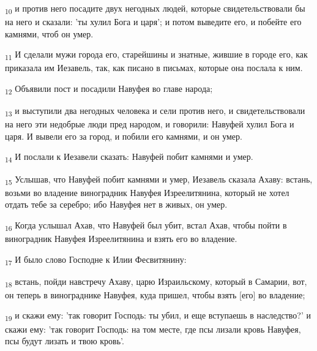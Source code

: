 \begin{tcolorbox}
\textsubscript{10} и против него посадите двух негодных людей, которые свидетельствовали бы на него и сказали: 'ты хулил Бога и царя'; и потом выведите его, и побейте его камнями, чтоб он умер.
\end{tcolorbox}
\begin{tcolorbox}
\textsubscript{11} И сделали мужи города его, старейшины и знатные, жившие в городе его, как приказала им Иезавель, так, как писано в письмах, которые она послала к ним.
\end{tcolorbox}
\begin{tcolorbox}
\textsubscript{12} Объявили пост и посадили Навуфея во главе народа;
\end{tcolorbox}
\begin{tcolorbox}
\textsubscript{13} и выступили два негодных человека и сели против него, и свидетельствовали на него эти недобрые люди пред народом, и говорили: Навуфей хулил Бога и царя. И вывели его за город, и побили его камнями, и он умер.
\end{tcolorbox}
\begin{tcolorbox}
\textsubscript{14} И послали к Иезавели сказать: Навуфей побит камнями и умер.
\end{tcolorbox}
\begin{tcolorbox}
\textsubscript{15} Услышав, что Навуфей побит камнями и умер, Иезавель сказала Ахаву: встань, возьми во владение виноградник Навуфея Изреелитянина, который не хотел отдать тебе за серебро; ибо Навуфея нет в живых, он умер.
\end{tcolorbox}
\begin{tcolorbox}
\textsubscript{16} Когда услышал Ахав, что Навуфей был убит, встал Ахав, чтобы пойти в виноградник Навуфея Изреелитянина и взять его во владение.
\end{tcolorbox}
\begin{tcolorbox}
\textsubscript{17} И было слово Господне к Илии Фесвитянину:
\end{tcolorbox}
\begin{tcolorbox}
\textsubscript{18} встань, пойди навстречу Ахаву, царю Израильскому, который в Самарии, вот, он теперь в винограднике Навуфея, куда пришел, чтобы взять [его] во владение;
\end{tcolorbox}
\begin{tcolorbox}
\textsubscript{19} и скажи ему: 'так говорит Господь: ты убил, и еще вступаешь в наследство?' и скажи ему: 'так говорит Господь: на том месте, где псы лизали кровь Навуфея, псы будут лизать и твою кровь'.
\end{tcolorbox}
